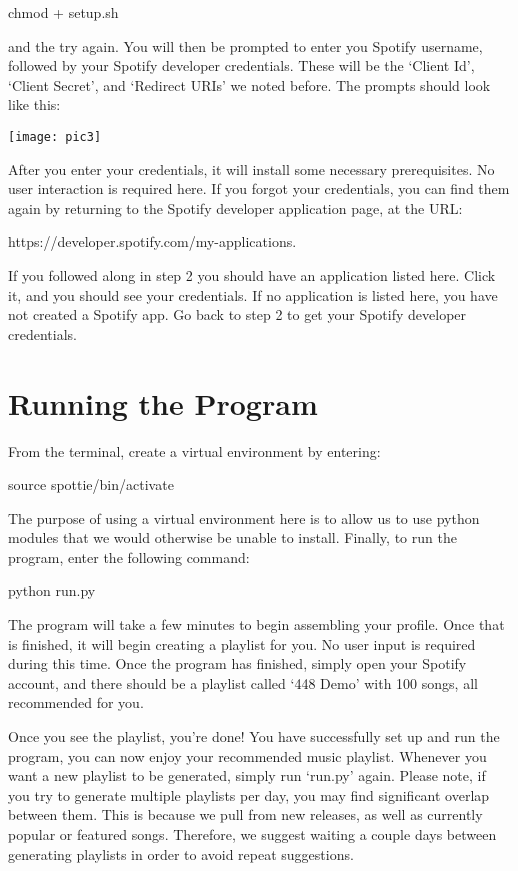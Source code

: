 \documentclass{roffin}
\begin{document}
\hspace{1cm} chmod + setup.sh

\hfill
\newline
 and the try again. You will then be prompted to enter you Spotify username, followed by your Spotify developer credentials. These will be the `Client Id', `Client Secret', and `Redirect URIs' we noted before. The prompts should look like this:
 
 \texttt{[image: pic3]}
 
 After you enter your credentials, it will install some necessary prerequisites. No user interaction is required here. If you forgot your credentials, you can find them again by returning to the Spotify developer application page, at the URL: 
\newline

\hspace{1cm} https://developer.spotify.com/my-applications.

\hfill
\newline
If you followed along in step 2 you should have an application listed here. Click it, and you should see your credentials. If no application is listed here, you have not created a Spotify app. Go back to step 2 to get your Spotify developer credentials.

\section{Running the Program} 
From the terminal, create a virtual environment by entering:
\newline

\hspace{1cm} source spottie/bin/activate

\hfill
\newline
The purpose of using a virtual environment here is to allow us to use python modules that we would otherwise be unable to install. Finally, to run the program, enter the following command:
\newline

\hspace{1cm} python run.py

\hfill
\newline
The program will take a few minutes to begin assembling your profile. Once that is finished, it will begin creating a playlist for you. No user input is required during this time. Once the program has finished, simply open your Spotify account, and there should be a playlist called `448 Demo' with 100 songs, all recommended for you. 

Once you see the playlist, you're done! You have successfully set up and run the program, you can now enjoy your recommended music playlist. Whenever you want a new playlist to be generated, simply run `run.py' again. Please note, if you try to generate multiple playlists per day, you may find significant overlap between them. This is because we pull from new releases, as well as currently popular or featured songs. Therefore, we suggest waiting a couple days between generating playlists in order to avoid repeat suggestions.
\end{document}
